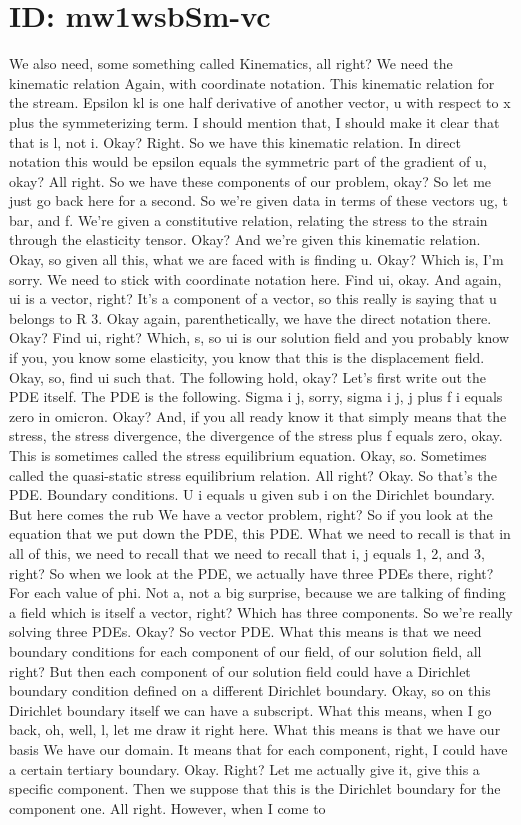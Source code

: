 \documentclass[10pt]{article}
\begin{document}
\section*{ID: mw1wsbSm-vc}
We also need, some something called Kinematics, all right? We need the kinematic relation Again, with coordinate notation. This kinematic relation for the stream. Epsilon kl is one half derivative of another vector, u with respect to x plus the symmeterizing term. I should mention that, I should make it clear that that is l, not i. Okay? Right. So we have this kinematic relation. In direct notation this would be epsilon equals the symmetric part of the gradient of u, okay? All right. So we have these components of our problem, okay? So let me just go back here for a second. So we're given data in terms of these vectors ug, t bar, and f. We're given a constitutive relation, relating the stress to the strain through the elasticity tensor. Okay? And we're given this kinematic relation. Okay, so given all this, what we are faced with is finding u. Okay? Which is, I'm sorry. We need to stick with coordinate notation here. Find ui, okay. And again, ui is a vector, right? It's a component of a vector, so this really is saying that u belongs to R 3. Okay again, parenthetically, we have the direct notation there. Okay? Find ui, right? Which, s, so ui is our solution field and you probably know if you, you know some elasticity, you know that this is the displacement field. Okay, so, find ui such that. The following hold, okay? Let's first write out the PDE itself. The PDE is the following. Sigma i j, sorry, sigma i j, j plus f i equals zero in omicron. Okay? And, if you all ready know it that simply means that the stress, the stress divergence, the divergence of the stress plus f equals zero, okay. This is sometimes called the stress equilibrium equation. Okay, so. Sometimes called the quasi-static stress equilibrium relation. All right? Okay. So that's the PDE. Boundary conditions. U i equals u given sub i on the Dirichlet boundary. But here comes the rub We have a vector problem, right? So if you look at the equation that we put down the PDE, this PDE. What we need to recall is that in all of this, we need to recall that we need to recall that i, j equals 1, 2, and 3, right? So when we look at the PDE, we actually have three PDEs there, right? For each value of phi. Not a, not a big surprise, because we are talking of finding a field which is itself a vector, right? Which has three components. So we're really solving three PDEs. Okay? So vector PDE. What this means is that we need boundary conditions for each component of our field, of our solution field, all right? But then each component of our solution field could have a Dirichlet boundary condition defined on a different Dirichlet boundary. Okay, so on this Dirichlet boundary itself we can have a subscript. What this means, when I go back, oh, well, l, let me draw it right here. What this means is that we have our basis We have our domain. It means that for each component, right, I could have a certain tertiary boundary. Okay. Right? Let me actually give it, give this a specific component. Then we suppose that this is the Dirichlet boundary for the component one. All right. However, when I come to 
\end{document}
